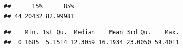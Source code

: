 \documentclass[
]{book}
\newenvironment{Shaded}{\begin{snugshade}}{\end{snugshade}}
\newcommand{\FloatTok}[1]{\textcolor[rgb]{0.00,0.00,0.81}{#1}}
\newcommand{\KeywordTok}[1]{\textcolor[rgb]{0.13,0.29,0.53}{\textbf{#1}}}
\newcommand{\NormalTok}[1]{#1}
\newcommand{\OperatorTok}[1]{\textcolor[rgb]{0.81,0.36,0.00}{\textbf{#1}}}
\newcommand{\StringTok}[1]{\textcolor[rgb]{0.31,0.60,0.02}{#1}}
\begin{document}
\begin{Shaded}
\end{Shaded}

\begin{verbatim}
##      15%      85% 
## 44.20432 82.99981
\end{verbatim}

\begin{Shaded}
\end{Shaded}

\begin{verbatim}
##    Min. 1st Qu.  Median    Mean 3rd Qu.    Max. 
##  0.1685  5.1514 12.3059 16.1934 23.0050 59.4011
\end{verbatim}
\end{document}
